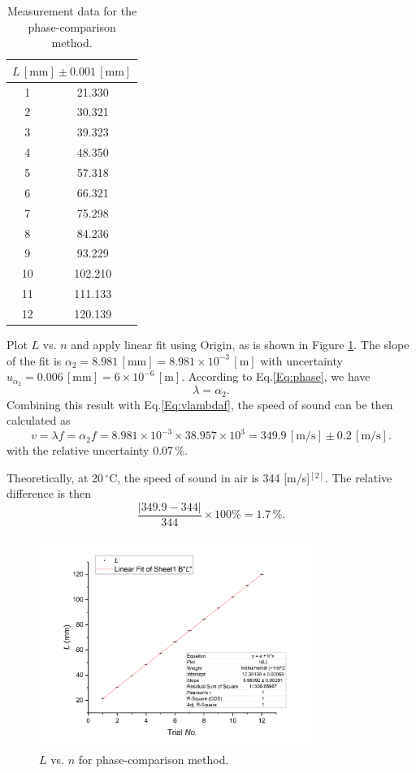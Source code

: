 \documentclass[a4paper]{article}
\begin{document}
\begin{table}[htbp]
\centering
\begin{tabular}{cc}
\hline
\multicolumn{2}{c}{$L\, [\text{mm}] \pm 0.001\, [\text{mm}]$} \\
\hline
1 & 21.330 \\
2 & 30.321 \\
3 & 39.323 \\
4 & 48.350 \\
5 & 57.318 \\
6 & 66.321 \\
7 & 75.298 \\
8 & 84.236 \\
9 & 93.229 \\
10 & 102.210 \\
11 & 111.133 \\
12 & 120.139 \\
\hline
\end{tabular}
\caption{Measurement data for the phase-comparison method.}\label{Tab:Phame}
\end{table}

Plot $L$ vs. $n$ and apply linear fit using Origin, as is shown in Figure \ref{Fig:plot2}. The slope of the fit is $\alpha_2 = 8.981\,[\text{mm}] = 8.981 \times 10^{-3}\,[\text{m}]$ with uncertainty $u_{\alpha_2} = 0.006\,[\text{mm}] = 6 \times 10^{-6}\,[\text{m}]$. According to Eq.\ref{Eq:phase}, we have
\[ \lambda = \alpha_2.\]
Combining this result with Eq.\ref{Eq:vlambdaf}, the speed of sound can be then calculated as
\begin{equation}\label{Eq:calofpha}
v = \lambda f = \alpha_2 f = 8.981 \times 10^{-3} \times 38.957 \times 10^3 = 349.9\,[\text{m/s}] \pm 0.2\,[\text{m/s}].
\end{equation}
with the relative uncertainty 0.07\,\%.

Theoretically, at 20\,$^{\circ}$C, the speed of sound in air is 344 [m/s]$^{[2]}$. The relative difference is then
\[\frac{|349.9 - 344|}{344} \times 100\% = 1.7\,\%.\]

\begin{figure}[htbp]
\centering
\includegraphics[width=0.8\textwidth]{plot2.png}
\caption{$L$ vs. $n$ for phase-comparison method.}\label{Fig:plot2}
\end{figure}
\end{document}
